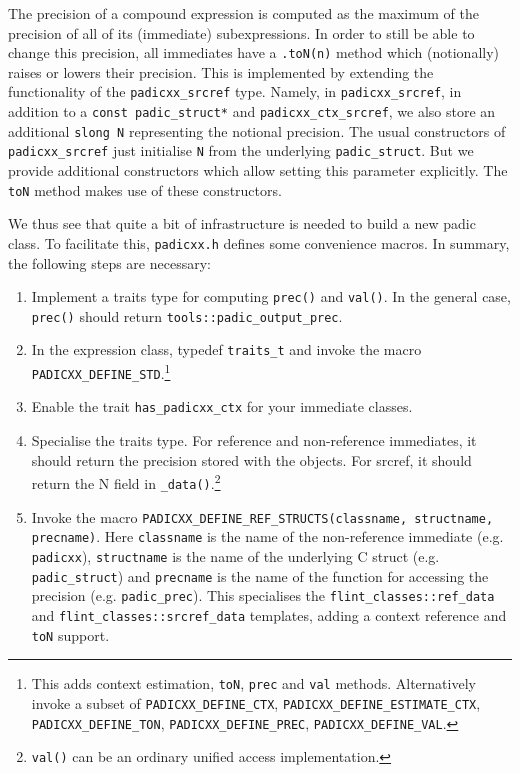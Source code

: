 \documentclass[a4paper,10pt]{book}
\newcommand{\code}{\lstinline}
\begin{document}
{{The precision of a compound expression is computed as the maximum of the
precision of all of its (immediate) subexpressions. In order to still be able to
change this precision, all immediates have a \code{.toN(n)} method which
(notionally) raises or lowers their precision. This is implemented by extending
the functionality of the \code{padicxx_srcref} type. Namely, in
\code{padicxx_srcref}, in addition to a \code{const padic_struct*} and
\code{padicxx_ctx_srcref}, we also store an additional \code{slong N}
representing the notional precision. The usual constructors of
\code{padicxx_srcref} just initialise \code{N} from the underlying
\code{padic_struct}. But we provide additional constructors which allow setting
this parameter explicitly. The \code{toN} method makes use of these
constructors.

We thus see that quite a bit of infrastructure is needed to build a new padic
class. To facilitate this, \code{padicxx.h} defines some convenience macros. In
summary, the following steps are necessary:

\begin{enumerate}
\item Implement a traits type for computing \code{prec()} and \code{val()}.
  In the general case, \code{prec()} should return
  \code{tools::padic_output_prec}.

\item In the expression class, typedef \code{traits_t} and invoke the macro
  \code{PADICXX_DEFINE_STD}.\footnote{This adds context estimation, \code{toN},
  \code{prec} and \code{val} methods. Alternatively invoke a subset of
  \code{PADICXX_DEFINE_CTX}, \code{PADICXX_DEFINE_ESTIMATE_CTX},
  \code{PADICXX_DEFINE_TON}, \code{PADICXX_DEFINE_PREC},
  \code{PADICXX_DEFINE_VAL}.}

\item Enable the trait \code{has_padicxx_ctx} for your immediate classes.

\item Specialise the traits type. For reference and non-reference immediates,
  it should return the precision stored with the objects. For srcref, it should
  return the N field in \code{_data()}.\footnote{\code{val()} can be an ordinary
  unified access implementation.}

\item Invoke the macro
  \code{PADICXX_DEFINE_REF_STRUCTS(classname, structname, precname)}.
  Here \code{classname} is the name of the non-reference immediate (e.g.
  \code{padicxx}), \code{structname} is the name of the underlying C struct (e.g.
  \code{padic_struct}) and \code{precname} is the name of the function for
  accessing the precision (e.g. \code{padic_prec}). This specialises the
  \code{flint_classes::ref_data} and \code{flint_classes::srcref_data}
  templates, adding a context reference and \code{toN} support.
\end{enumerate}

}}
\end{document}
